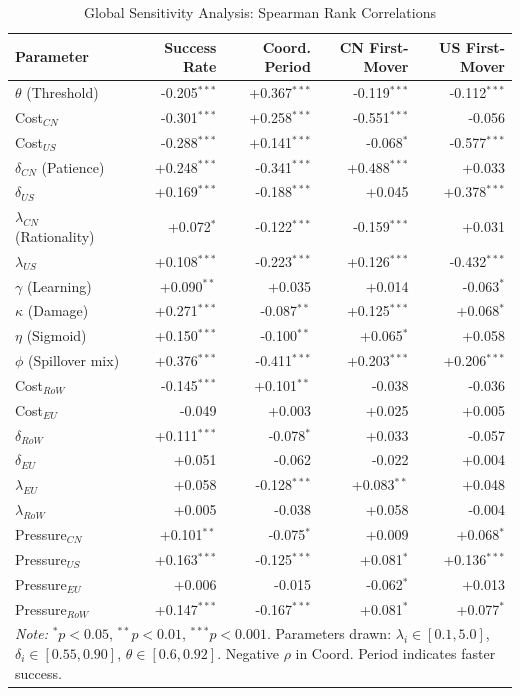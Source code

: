 \begin{table}[htbp]
\centering
\small
\caption{Global Sensitivity Analysis: Spearman Rank Correlations}
\label{tab:gsa_correlations}
\begin{tabular}{lrrrr}
\toprule
\textbf{Parameter} & \textbf{Success Rate} & \textbf{Coord. Period} & \textbf{CN First-Mover} & \textbf{US First-Mover} \\
\midrule
$\theta$ (Threshold) & -0.205$^{***}$ & +0.367$^{***}$ & -0.119$^{***}$ & -0.112$^{***}$ \\
Cost$_{CN}$ & -0.301$^{***}$ & +0.258$^{***}$ & -0.551$^{***}$ & -0.056 \\
Cost$_{US}$ & -0.288$^{***}$ & +0.141$^{***}$ & -0.068$^{*}$ & -0.577$^{***}$ \\
$\delta_{CN}$ (Patience) & +0.248$^{***}$ & -0.341$^{***}$ & +0.488$^{***}$ & +0.033 \\
$\delta_{US}$ & +0.169$^{***}$ & -0.188$^{***}$ & +0.045 & +0.378$^{***}$ \\
$\lambda_{CN}$ (Rationality) & +0.072$^{*}$ & -0.122$^{***}$ & -0.159$^{***}$ & +0.031 \\
$\lambda_{US}$ & +0.108$^{***}$ & -0.223$^{***}$ & +0.126$^{***}$ & -0.432$^{***}$ \\
$\gamma$ (Learning) & +0.090$^{**}$ & +0.035 & +0.014 & -0.063$^{*}$ \\
$\kappa$ (Damage) & +0.271$^{***}$ & -0.087$^{**}$ & +0.125$^{***}$ & +0.068$^{*}$ \\
$\eta$ (Sigmoid) & +0.150$^{***}$ & -0.100$^{**}$ & +0.065$^{*}$ & +0.058 \\
$\phi$ (Spillover mix) & +0.376$^{***}$ & -0.411$^{***}$ & +0.203$^{***}$ & +0.206$^{***}$ \\
Cost$_{RoW}$ & -0.145$^{***}$ & +0.101$^{**}$ & -0.038 & -0.036 \\
Cost$_{EU}$ & -0.049 & +0.003 & +0.025 & +0.005 \\
$\delta_{RoW}$ & +0.111$^{***}$ & -0.078$^{*}$ & +0.033 & -0.057 \\
$\delta_{EU}$ & +0.051 & -0.062 & -0.022 & +0.004 \\
$\lambda_{EU}$ & +0.058 & -0.128$^{***}$ & +0.083$^{**}$ & +0.048 \\
$\lambda_{RoW}$ & +0.005 & -0.038 & +0.058 & -0.004 \\
Pressure$_{CN}$ & +0.101$^{**}$ & -0.075$^{*}$ & +0.009 & +0.068$^{*}$ \\
Pressure$_{US}$ & +0.163$^{***}$ & -0.125$^{***}$ & +0.081$^{*}$ & +0.136$^{***}$ \\
Pressure$_{EU}$ & +0.006 & -0.015 & -0.062$^{*}$ & +0.013 \\
Pressure$_{RoW}$ & +0.147$^{***}$ & -0.167$^{***}$ & +0.081$^{*}$ & +0.077$^{*}$ \\
\bottomrule
\multicolumn{5}{p{14cm}}{\footnotesize \textit{Note:} $^{*}p<0.05$, $^{**}p<0.01$, $^{***}p<0.001$. Parameters drawn: $\lambda_i \in [0.1, 5.0]$, $\delta_i \in [0.55, 0.90]$, $\theta \in [0.6, 0.92]$. Negative $\rho$ in Coord. Period indicates faster success.}
\\
\end{tabular}
\end{table}